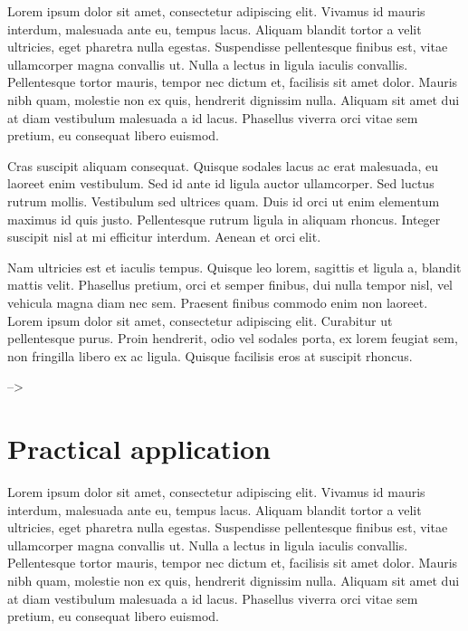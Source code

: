 \documentclass[a4paper, nobind]{templates/ociamthesis}
\theoremstyle{definition}
\theoremstyle{definition}
\theoremstyle{definition}
\theoremstyle{remark}
\begin{document}
Lorem ipsum dolor sit amet, consectetur adipiscing elit. Vivamus id mauris interdum, malesuada ante eu, tempus lacus. Aliquam blandit tortor a velit ultricies, eget pharetra nulla egestas. Suspendisse pellentesque finibus est, vitae ullamcorper magna convallis ut. Nulla a lectus in ligula iaculis convallis. Pellentesque tortor mauris, tempor nec dictum et, facilisis sit amet dolor. Mauris nibh quam, molestie non ex quis, hendrerit dignissim nulla. Aliquam sit amet dui at diam vestibulum malesuada a id lacus. Phasellus viverra orci vitae sem pretium, eu consequat libero euismod.

Cras suscipit aliquam consequat. Quisque sodales lacus ac erat malesuada, eu laoreet enim vestibulum. Sed id ante id ligula auctor ullamcorper. Sed luctus rutrum mollis. Vestibulum sed ultrices quam. Duis id orci ut enim elementum maximus id quis justo. Pellentesque rutrum ligula in aliquam rhoncus. Integer suscipit nisl at mi efficitur interdum. Aenean et orci elit.

Nam ultricies est et iaculis tempus. Quisque leo lorem, sagittis et ligula a, blandit mattis velit. Phasellus pretium, orci et semper finibus, dui nulla tempor nisl, vel vehicula magna diam nec sem. Praesent finibus commodo enim non laoreet. Lorem ipsum dolor sit amet, consectetur adipiscing elit. Curabitur ut pellentesque purus. Proin hendrerit, odio vel sodales porta, ex lorem feugiat sem, non fringilla libero ex ac ligula. Quisque facilisis eros at suscipit rhoncus.

--\textgreater{}

\hypertarget{chap:practical-app}{%
\chapter{\texorpdfstring{\textbf{Practical application}}{Practical application}}\label{chap:practical-app}}

\minitoc  


Lorem ipsum dolor sit amet, consectetur adipiscing elit. Vivamus id mauris interdum, malesuada ante eu, tempus lacus. Aliquam blandit tortor a velit ultricies, eget pharetra nulla egestas. Suspendisse pellentesque finibus est, vitae ullamcorper magna convallis ut. Nulla a lectus in ligula iaculis convallis. Pellentesque tortor mauris, tempor nec dictum et, facilisis sit amet dolor. Mauris nibh quam, molestie non ex quis, hendrerit dignissim nulla. Aliquam sit amet dui at diam vestibulum malesuada a id lacus. Phasellus viverra orci vitae sem pretium, eu consequat libero euismod.
\end{document}
